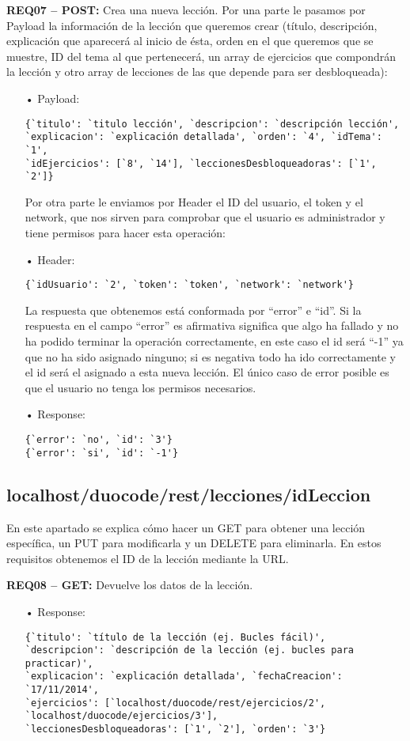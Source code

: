 \textbf{REQ07 – POST:} Crea una nueva lección. Por una parte le pasamos por Payload la información de la lección que queremos crear (título, descripción, explicación que aparecerá al inicio de ésta, orden en el que queremos que se muestre, ID del tema al que pertenecerá, un array de ejercicios que compondrán la lección y otro array de lecciones de las que depende para ser desbloqueada):
\begin{itemize}
\item[•]Payload: 
{\codesize
\begin{verbatim}
{`titulo': `titulo lección', `descripcion': `descripción lección', 
`explicacion': `explicación detallada', `orden': `4', `idTema': `1', 
`idEjercicios': [`8', `14'], `leccionesDesbloqueadoras': [`1', `2']}
\end{verbatim}
}

Por otra parte le enviamos por Header el ID del usuario, el token y el network, que nos sirven para comprobar que el usuario es administrador y tiene permisos para hacer esta operación:
\item[•]Header: 
{\codesize
\begin{verbatim}
{`idUsuario': `2', `token': `token', `network': `network'}
\end{verbatim}
}

La respuesta que obtenemos está conformada por ``error'' e ``id''. Si la respuesta en el campo ``error'' es afirmativa significa que algo ha fallado y no ha podido terminar la operación correctamente, en este caso el id será ``-1'' ya que no ha sido asignado ninguno; si es negativa todo ha ido correctamente y el id será el asignado a esta nueva lección. El único caso de error posible es que el usuario no tenga los permisos necesarios.
\item[•]Response: 
{\codesize
\begin{verbatim}
{`error': `no', `id': `3'}
{`error': `si', `id': `-1'}
\end{verbatim}
}
\end{itemize}

\subsection{localhost/duocode/rest/lecciones/idLeccion}
En este apartado se explica cómo hacer un GET para obtener una lección específica, un PUT para modificarla y un DELETE para eliminarla.
En estos requisitos obtenemos el ID de la lección mediante la URL.

\textbf{REQ08 – GET:} Devuelve los datos de la lección.
\begin{itemize}
\item[•]Response:
{\codesize
\begin{verbatim}
{`titulo': `título de la lección (ej. Bucles fácil)', 
`descripcion': `descripción de la lección (ej. bucles para practicar)', 
`explicacion': `explicación detallada', `fechaCreacion': `17/11/2014',
`ejercicios': [`localhost/duocode/rest/ejercicios/2', 
`localhost/duocode/ejercicios/3'], 
`leccionesDesbloqueadoras': [`1', `2'], `orden': `3'}
\end{verbatim}
}
\end{itemize}


